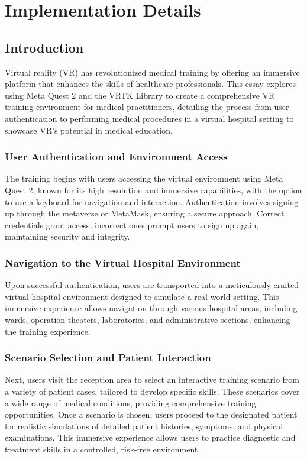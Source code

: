\chapter{Implementation Details}
\label{ch:implementation}

\section{Introduction}
Virtual reality (VR) has revolutionized medical training by offering an immersive platform that enhances the skills of healthcare professionals. This essay explores using Meta Quest 2 and the VRTK Library to create a comprehensive VR training environment for medical practitioners, detailing the process from user authentication to performing medical procedures in a virtual hospital setting to showcase VR's potential in medical education.

\subsection{User Authentication and Environment Access}
The training begins with users accessing the virtual environment using Meta Quest 2, known for its high resolution and immersive capabilities, with the option to use a keyboard for navigation and interaction. Authentication involves signing up through the metaverse or MetaMask, ensuring a secure approach. Correct credentials grant access; incorrect ones prompt users to sign up again, maintaining security and integrity.
\subsection{Navigation to the Virtual Hospital Environment}
Upon successful authentication, users are transported into a meticulously crafted virtual hospital environment designed to simulate a real-world setting. This immersive experience allows navigation through various hospital areas, including wards, operation theaters, laboratories, and administrative sections, enhancing the training experience.

\subsection{Scenario Selection and Patient Interaction}
Next, users visit the reception area to select an interactive training scenario from a variety of patient cases, tailored to develop specific skills. These scenarios cover a wide range of medical conditions, providing comprehensive training opportunities. Once a scenario is chosen, users proceed to the designated patient for realistic simulations of detailed patient histories, symptoms, and physical examinations. This immersive experience allows users to practice diagnostic and treatment skills in a controlled, risk-free environment.
